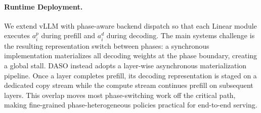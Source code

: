 \documentclass[letterpaper]{article} %
\begin{document}
\paragraph{Runtime Deployment.}
We extend vLLM with phase-aware backend dispatch so that each Linear module executes $a_i^p$ during prefill and $a_i^d$ during decoding. The main systems challenge is the resulting representation switch between phases: a synchronous implementation materializes all decoding weights at the phase boundary, creating a global stall. DASO instead adopts a layer-wise asynchronous materialization pipeline. Once a layer completes prefill, its decoding representation is staged on a dedicated copy stream while the compute stream continues prefill on subsequent layers. This overlap moves most phase-switching work off the critical path, making fine-grained phase-heterogeneous policies practical for end-to-end serving.
\end{document}

